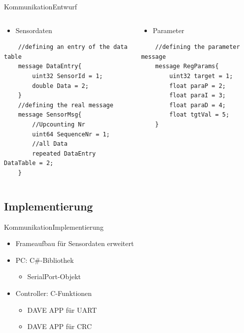 \begin{frame}[fragile]{Kommunikation}{Entwurf}
  \begin{columns}[T]
  \begin{column}{5cm}
    \begin{itemize}
      \item Sensordaten
    \end{itemize}
    \begin{lstlisting}
    //defining an entry of the data table
    message DataEntry{
	    uint32 SensorId = 1;
	    double Data = 2;
    }
    //defining the real message
    message SensorMsg{
	    //Upcounting Nr
	    uint64 SequenceNr = 1;
	    //all Data
	    repeated DataEntry DataTable = 2;
    }
    \end{lstlisting}
  \end{column}
  \begin{column}{5cm}
    \begin{itemize}
      \item Parameter
    \end{itemize}
    \begin{lstlisting}
    //defining the parameter message
    message RegParams{
	    uint32 target = 1;
	    float paraP = 2;
	    float paraI = 3;
	    float paraD = 4;
	    float tgtVal = 5;
    }
    \end{lstlisting}
  \end{column}
  \end{columns}
\end{frame}
\subsection{Implementierung}
\begin{frame}{Kommunikation}{Implementierung}
  \begin{itemize}
    \item Frameaufbau f\"ur Sensordaten erweitert
  \end{itemize}
  \begin{itemize}
    \item PC: C\#-Bibliothek
    \begin{itemize}
    \item SerialPort-Objekt
    \end{itemize}
    \item Controller: C-Funktionen
    \begin{itemize}
      \item DAVE APP f\"ur UART
      \item DAVE APP f\"ur CRC
    \end{itemize}
  \end{itemize}
\end{frame}
